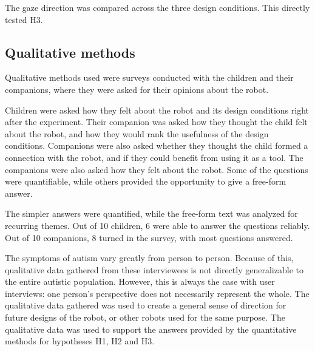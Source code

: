 The gaze direction was compared across the three design conditions. This directly tested H3.


\subsection{Qualitative methods}

Qualitative methods used were surveys conducted with the children and their companions, where they were asked for their opinions about the robot.

Children were asked how they felt about the robot and its design conditions right after the experiment. Their companion was asked how they thought the child felt about the robot, and how they would rank the usefulness of the design conditions. Companions were also asked whether they thought the child formed a connection with the robot, and if they could benefit from using it as a tool. The companions were also asked how they felt about the robot. Some of the questions were quantifiable, while others provided the opportunity to give a free-form answer.

The simpler answers were quantified, while the free-form text was analyzed for recurring themes. Out of 10 children, 6 were able to answer the questions reliably. Out of 10 companions, 8 turned in the survey, with most questions answered.

The symptoms of autism vary greatly from person to person. Because of this, qualitative data gathered from these interviewees is not directly generalizable to the entire autistic population. However, this is always the case with user interviews: one person's perspective does not necessarily represent the whole. The qualitative data gathered was used to create a general sense of direction for future designs of the robot, or other robots used for the same purpose. The qualitative data was used to support the answers provided by the quantitative methods for hypotheses H1, H2 and H3.
